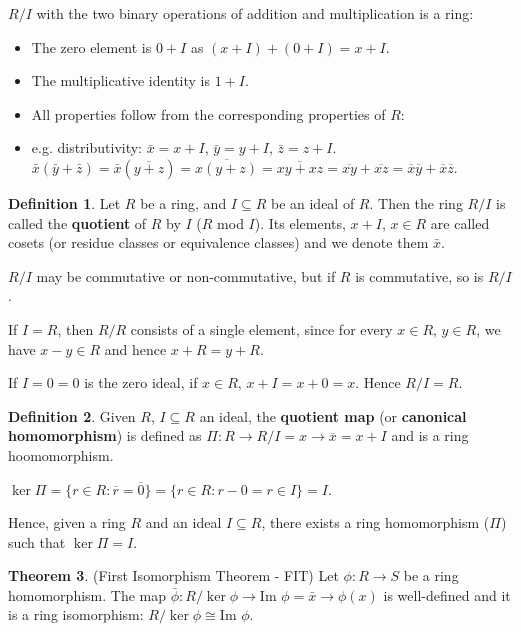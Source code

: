 \documentclass[12pt,a4paper]{article}
\theoremstyle{definition}
\newtheorem{definition}{Definition}[subsection]
\newtheorem{theorem}[definition]{Theorem}
\begin{document}
$R / I$ with the two binary operations of addition and multiplication is a ring:
\begin{itemize}
	\item The zero element is $0 + I$ as $(x + I) + (0 + I) = x + I$.
	\item The multiplicative identity is $1 + I$.
	\item All properties follow from the corresponding properties of $R$:
	\item e.g. distributivity: $\bar{x} = x + I$, $\bar{y} = y + I$, $\bar{z} = z + I$.
	$\bar{x}(\bar{y} + \bar{z}) = \bar{x}(\overline{y + z}) = \overline{x(y + z)} = \overline{xy + xz} = \overline{xy} + \overline{xz} = \overline{x}\overline{y} + \overline{x}\overline{z}$.
\end{itemize}

\begin{definition}
	Let $R$ be a ring, and $I \subseteq R$ be an ideal of $R$. Then the ring $R / I$ is called the \textbf{quotient} of $R$ by $I$ ($R$ mod $I$). Its elements, $x + I$, $x \in R$ are called cosets (or residue classes or equivalence classes) and we denote them $\bar{x}$.
	
	$R / I$ may be commutative or non-commutative, but if $R$ is commutative, so is $R / I$.

	If $I = R$, then $R / R$ consists of a single element, since for every $x \in R$, $y \in R$, we have $x - y \in R$ and hence $x + R = y + R$.

	If $I = 0 = {0}$ is the zero ideal, if $x \in R$, $x + I = x + 0 = x$. Hence $R / I = R$.
\end{definition}

\begin{definition}
	Given $R$, $I \subseteq R$ an ideal, the \textbf{quotient map} (or \textbf{canonical homomorphism}) is defined as $\Pi: R \rightarrow R / I = x \rightarrow \overline{x} = x + I$ and is a ring hoomomorphism.

	$\ker \Pi = \{r \in R: \overline{r} = \overline{0}\} = \{r \in R: r - 0 = r \in I\} = I$.
\end{definition}

Hence, given a ring $R$ and an ideal $I \subseteq R$, there exists a ring homomorphism ($\Pi$) such that $\ker \Pi = I$.

\begin{theorem}
	(First Isomorphism Theorem - FIT) Let $\phi: R \rightarrow S$ be a ring homomorphism. The map $\bar{\phi}: R / \ker \phi \rightarrow \text{Im } \phi = \bar{x} \rightarrow \phi(x)$ is well-defined and it is a ring isomorphism: $R / \ker \phi \cong \text{Im } \phi$.
\end{theorem}
\end{document}
